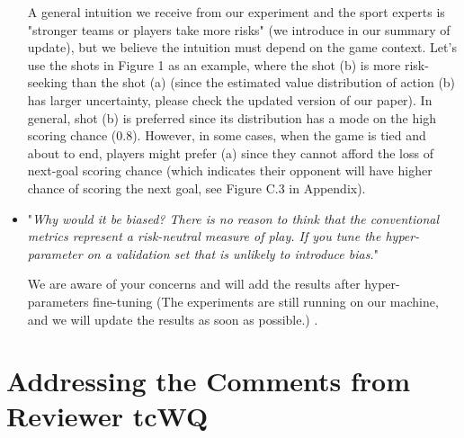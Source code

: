 \documentclass[letterpaper]{article} %
\begin{document}
\begin{itemize}
    A general intuition we receive from our experiment and the sport experts is "stronger teams or players take more risks" (we introduce in our summary of update), but we believe the intuition must depend on the game context. Let's use the shots in Figure 1 as an example, where the shot (b) is more risk-seeking than the shot (a) (since the estimated value distribution of action (b) has larger uncertainty, please check the updated version of our paper). In general, shot (b) is preferred since its distribution has a mode on the high scoring chance (0.8). However, in some cases, when the game is tied and about to end, players might prefer (a) since they cannot afford the loss of next-goal scoring chance (which indicates their opponent will have higher chance of scoring the next goal, see Figure C.3 in Appendix).
    \medskip

    \item "{\it Why would it be biased? There is no reason to think that the conventional metrics represent a risk-neutral measure of play. If you tune the hyper-parameter on a validation set that is unlikely to introduce bias.}"

    We are aware of your concerns and will add the results after hyper-parameters fine-tuning (The experiments are still running on our machine, and we will update the results as soon as possible.) .\medskip
\end{itemize}

\section{Addressing the Comments from Reviewer tcWQ}
\end{document}

